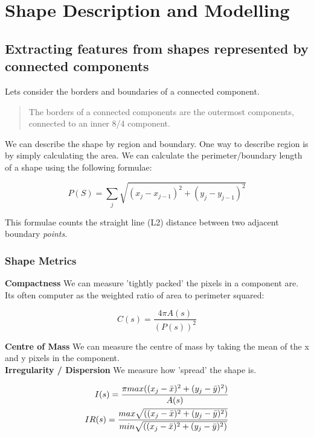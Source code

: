 \section{Shape Description and Modelling}

\subsection{Extracting features from shapes represented by connected components}

Lets consider the borders and boundaries of a connected component.

\begin{quote}
    The borders of a connected components are the outermost components, connected to an inner 8/4 component.
\end{quote}

\noindent We can describe the shape by region and boundary. One way to describe region is by simply calculating the area. We can calculate the perimeter/boundary length of a shape using the following formulae:

\begin{equation}
    P(S) = \sum_{j}\sqrt{( x_{j} - x_{j-1} )^{2} + (  y_{j} - y_{j-1} )^{2}}
\end{equation}

This formulae counts the straight line (L2) distance between two adjacent boundary \textit{points}.

\subsubsection{Shape Metrics}

\textbf{Compactness }We can measure 'tightly packed' the pixels in a component are. Its often computer as the weighted ratio of area to perimeter squared:

\begin{equation}
    C(s) = \frac{4\pi A(s)}{(P(s))^{2}}
\end{equation}

\noindent\textbf{Centre of Mass} We can measure the centre of mass by taking the mean of the x and y pixels in the component. \\

\noindent\textbf{Irregularity / Dispersion} We measure how 'spread' the shape is.

\begin{align}
    I(s) = \frac{\pi max( ( x_{j} - \Bar{x}  )^{2} + ( y_{j} - \Bar{y}  )^{2}) }{A(s)} \\
    IR(s) = \frac{ max \sqrt{( ( x_{j} - \Bar{x}  )^{2} + ( y_{j} - \Bar{y}  )^{2})} }{ min \sqrt{( ( x_{j} - \Bar{x}  )^{2} + ( y_{j} - \Bar{y}  )^{2})} }
\end{align}

